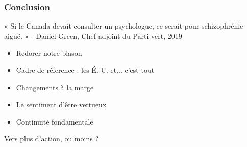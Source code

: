 \documentclass[14pt]{beamer}
\begin{document}
	\begin{frame}
		\frametitle{Conclusion} 
	« Si le Canada devait consulter un psychologue, ce serait pour schizophrénie aiguë. » - Daniel Green, Chef adjoint du Parti vert, 2019
	
	\bigskip

		\begin{itemize}
			\pause
			\item Redorer notre blason
			\pause
			\item Cadre de réference : les É.-U. et... c'est tout
			\pause
			\item Changements à la marge
			\pause
			\item Le sentiment d'être vertueux 
			\pause
			\item Continuité fondamentale 
		\end{itemize}
	\bigskip
	\pause
	Vers plus d'action, ou moins ?
\end{frame}
\end{document}
